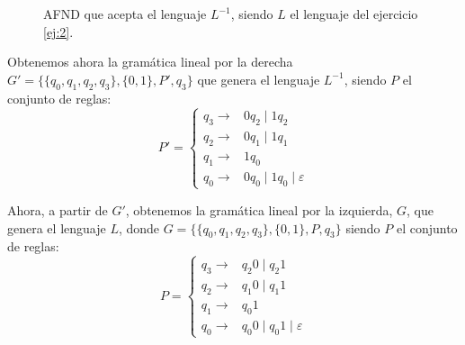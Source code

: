 \documentclass[12pt]{article}
\begin{document}
\begin{ejercicio}
\begin{enumerate}
\begin{figure}[H]
                \caption{AFND que acepta el lenguaje $L^{-1}$, siendo $L$ el lenguaje del ejercicio \ref{ej:2}.}
                \label{fig:ej:2:AFND:inverso}
            \end{figure}

            Obtenemos ahora la gramática lineal por la derecha $G'=\{\{q_0,q_1,q_2,q_3\},\{0,1\},P',q_3\}$ que genera el lenguaje $L^{-1}$, siendo $P$ el conjunto de reglas:
            \begin{equation*}
                P'=\begin{cases}
                    q_3 \rightarrow & 0q_2 \mid 1q_2 \\
                    q_2 \rightarrow & 0q_1 \mid 1q_1 \\
                    q_1 \rightarrow & 1q_0 \\
                    q_0 \rightarrow & 0q_0 \mid 1q_0 \mid \varepsilon
                \end{cases}
            \end{equation*}

            Ahora, a partir de $G'$, obtenemos la gramática lineal por la izquierda, $G$, que genera el lenguaje $L$, donde $G=\{\{q_0,q_1,q_2,q_3\},\{0,1\},P,q_3\}$ siendo $P$ el conjunto de reglas:
            \begin{equation*}
                P=\begin{cases}
                    q_3 \rightarrow & q_2 0 \mid q_2 1 \\
                    q_2 \rightarrow & q_1 0 \mid q_1 1 \\
                    q_1 \rightarrow & q_0 1 \\
                    q_0 \rightarrow & q_0 0 \mid q_0 1 \mid \varepsilon
                \end{cases}
            \end{equation*}

        \end{enumerate}
    \end{ejercicio}
\end{document}
